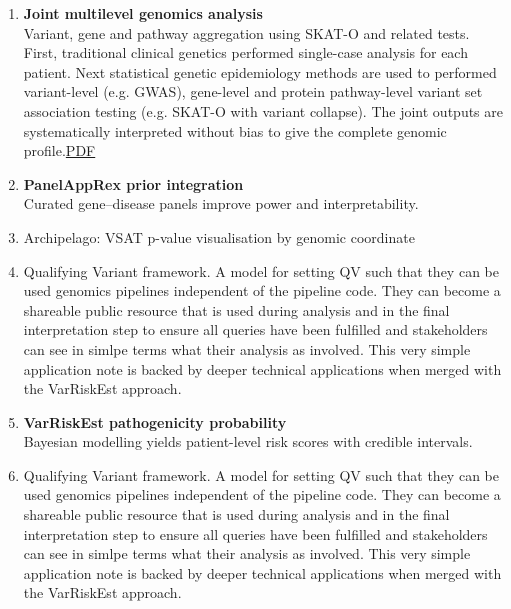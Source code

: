 \begin{enumerate}
  \item \textbf{Joint multilevel genomics analysis}\\
  Variant, gene and pathway aggregation using SKAT-O and related tests.
  First, traditional clinical genetics performed single-case analysis for each patient. Next statistical genetic epidemiology methods are used to performed variant-level (e.g. GWAS), gene-level and protein pathway-level variant set association testing (e.g. SKAT-O with variant collapse). The joint outputs are systematically interpreted without bias to give the complete genomic profile.\citep{Lawless2024Rare}{\href{https://doi.org/10.1101/XXXXXX}{PDF}}
  
  \item \textbf{PanelAppRex prior integration}\\
  Curated gene–disease panels improve power and interpretability.\citep{Lawless2025PanelAppRex}
  
  

  
  \item Archipelago: VSAT p-value visualisation by genomic coordinate \cite{Lawless2025Archipelago}
  
    
    \item Qualifying Variant framework. A model for setting QV such that they can be used genomics pipelines independent of the pipeline code. They can become a shareable public resource that is used during analysis and in the final interpretation step to ensure all queries have been fulfilled and stakeholders can see in simlpe terms what their analysis as involved. This very simple application note is backed by deeper technical applications when merged with the VarRiskEst approach.
  
  \item \textbf{VarRiskEst pathogenicity probability}\\
  Bayesian modelling yields patient-level risk scores with credible intervals.\citep{Lawless2025Quantitative}
  
    \item Qualifying Variant framework. A model for setting QV such that they can be used genomics pipelines independent of the pipeline code. They can become a shareable public resource that is used during analysis and in the final interpretation step to ensure all queries have been fulfilled and stakeholders can see in simlpe terms what their analysis as involved. This very simple application note is backed by deeper technical applications when merged with the VarRiskEst approach.
    

\end{enumerate}

